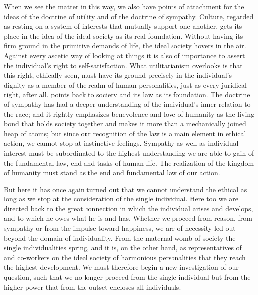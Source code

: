 \documentclass[12pt,a4paper,openany]{book}
\newcommand{\opage}[1]{\marginnote{\footnotesize\textit{[#1]}}}
\begin{document}
When we see the matter in this way, we also have points of attachment for the
ideas of the doctrine of utility and of the doctrine of sympathy. Culture,
regarded as resting on a system of interests that mutually support one
another, gets its place in the idea of the ideal society as its real
foundation. Without having its firm ground in the primitive demands of life,
the ideal society hovers in the air. Against every ascetic way of looking at
things it is also of importance to assert the individual's right to
self-satisfaction. What utilitarianism overlooks is that this right, ethically
seen, must have its ground precisely in the individual's dignity as a member
of the realm of human personalities, just as every juridical right, after all,
points back to society and its law as its foundation. The doctrine of sympathy
has had a deeper understanding of the individual's inner relation to the race;
and it rightly emphasizes benevolence and love of humanity as the living bond
that holds society together and makes it more than a mechanically joined heap
of atoms; but since our recognition of the law is a main element in ethical
action, we cannot stop at instinctive feelings. Sympathy as well as individual
interest must be subordinated to the highest understanding we are able to gain
of \opage{54}the fundamental law, end and tasks of human life. The realization
of the kingdom of humanity must stand as the end and fundamental law of our
action.

But here it has once again turned out that we cannot understand the ethical as
long as we stop at the consideration of the single individual. Here too we are
directed back to the great connection in which the individual arises and
develops, and to which he owes what he is and has. Whether we proceed from
reason, from sympathy or from the impulse toward happiness, we are of
necessity led out beyond the domain of individuality. From the maternal womb
of society the single individualities spring, and it is, on the other hand, as
representatives of and co-workers on the ideal society of harmonious
personalities that they reach the highest development. We must therefore begin
a new investigation of our question, such that we no longer proceed from the
single individual but from the higher power that from the outset encloses all
individuals.
\end{document}
